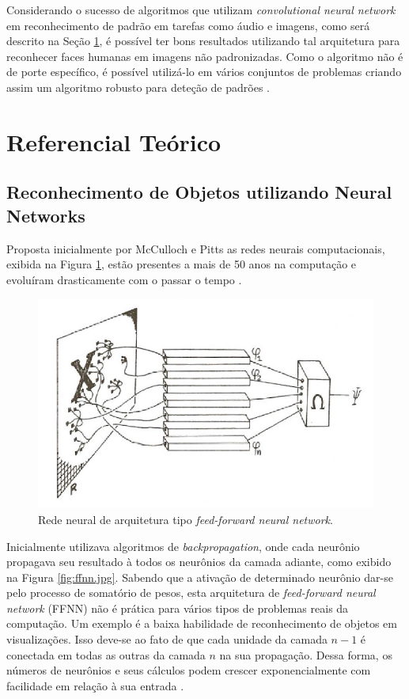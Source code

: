 \documentclass[10pt, conference]{IEEEtran}
\begin{document}
	Considerando o sucesso de algoritmos que utilizam \textit{convolutional neural network} em reconhecimento de padrão em tarefas como áudio e imagens, como será descrito na Seção \ref{sec:rt}, é possível ter bons resultados utilizando tal arquitetura para reconhecer faces humanas em imagens não padronizadas. Como o algoritmo não é de porte específico, é possível utilizá-lo em vários conjuntos de problemas criando assim um algoritmo robusto para deteção de padrões \cite{Haoxiang2015}.

\section{Referencial Teórico} \label{sec:rt}
	\subsection{Reconhecimento de Objetos utilizando Neural Networks}
		Proposta inicialmente por McCulloch e Pitts \cite{McCulloch1943} as redes neurais computacionais, exibida na Figura \ref{fig:single_layer_cnn.png}, estão presentes a mais de 50 anos na computação e evoluíram drasticamente com o passar o tempo \cite{Bengio-2009}.

		\begin{figure}[t]
			\centering
			\includegraphics[width=1.0\linewidth]{img/single_layer_cnn.png}
			\caption{Rede neural de arquitetura tipo \textit{feed-forward neural network}.}
			\label{fig:single_layer_cnn.png}
		\end{figure}

		Inicialmente utilizava algoritmos de \textit{backpropagation}, onde cada neurônio propagava seu resultado à todos os neurônios da camada adiante, como exibido na Figura \ref{fig:ffnn.jpg}. Sabendo que a ativação de determinado neurônio dar-se pelo processo de somatório de pesos, esta arquitetura de \textit{feed-forward neural network} (FFNN) não é prática para vários tipos de problemas reais da computação. Um exemplo é a baixa habilidade de reconhecimento de objetos em visualizações. Isso deve-se ao fato de que cada unidade da camada $ n-1 $ é conectada em todas as outras da camada $ n $ na sua propagação. Dessa forma, os números de neurônios e seus cálculos podem crescer exponencialmente com facilidade em relação à sua entrada \cite{Glorot2010}.
\end{document}
